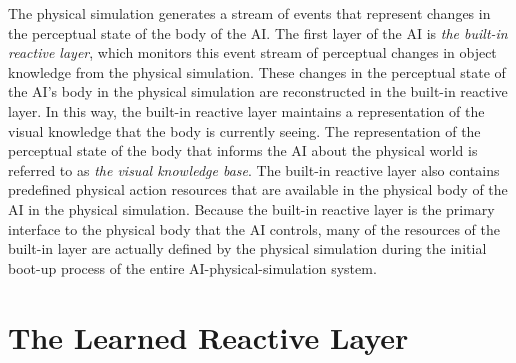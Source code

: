 The physical simulation generates a stream of events that represent
changes in the perceptual state of the body of the AI.  The first
layer of the AI is \emph{the built-in reactive layer}, which monitors
this event stream of perceptual changes in object knowledge from the
physical simulation.  These changes in the perceptual state of the
AI's body in the physical simulation are reconstructed in the built-in
reactive layer.  In this way, the built-in reactive layer maintains a
representation of the visual knowledge that the body is currently
seeing.  The representation of the perceptual state of the body that
informs the AI about the physical world is referred to as \emph{the
  visual knowledge base}.  The built-in reactive layer also contains
predefined physical action resources that are available in the
physical body of the AI in the physical simulation.  Because the
built-in reactive layer is the primary interface to the physical body
that the AI controls, many of the resources of the built-in layer are
actually defined by the physical simulation during the initial boot-up
process of the entire AI-physical-simulation system.

\section{The Learned Reactive Layer}

